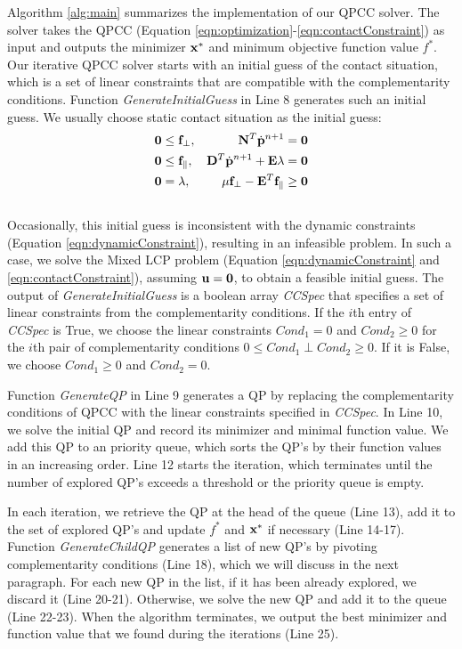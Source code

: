 Algorithm \ref{alg:main} summarizes the implementation of our QPCC solver. The solver takes the QPCC (Equation \ref{eqn:optimization}-\ref{eqn:contactConstraint}) as input and outputs the minimizer $\mathbf{x}^*$ and minimum objective function value $f^*$. Our iterative QPCC solver starts with an initial guess of the contact situation, which is a set of linear constraints that are compatible with the complementarity conditions. Function \emph{GenerateInitialGuess} in Line 8 generates such an initial guess. We usually choose static contact situation as the initial guess:
\begin{align}
\nonumber & \mathbf{0} \leq \mathbf{f}_\perp, & \mathbf{N}^T\dot{\mathbf{p}}^{n+1} = \mathbf{0}\\
\nonumber & \mathbf{0} \leq \mathbf{f}_\parallel, &  \mathbf{D}^T \dot{\mathbf{p}}^{n+1} + \mathbf{E} \lambda = \mathbf{0}\\
\nonumber & \mathbf{0} = \lambda, & \mu \mathbf{f}_\perp - \mathbf{E}^T \mathbf{f}_\parallel \geq \mathbf{0} \\
 \nonumber
\end{align}
Occasionally, this initial guess is inconsistent with the dynamic constraints (Equation \ref{eqn:dynamicConstraint}), resulting in an infeasible problem. In
such a case, we solve the Mixed LCP problem (Equation \ref{eqn:dynamicConstraint} and \ref{eqn:contactConstraint}), assuming $\mathbf{u}=\mathbf{0}$, to obtain a feasible initial guess. The output of \emph{GenerateInitialGuess} is a boolean array \emph{CCSpec} that specifies a set of linear constraints from the complementarity conditions. If the $i$th entry of \emph{CCSpec} is True, we choose the linear constraints $Cond_1 = 0$ and $Cond_2 \geq 0$ for the $i$th pair of complementarity conditions $0\leq Cond_1 \perp Cond_2 \geq 0$. If it is False, we choose $Cond_1 \geq 0$ and $Cond_2 = 0$.

Function \emph{GenerateQP} in Line 9 generates a QP by replacing the complementarity conditions of QPCC with the linear constraints specified in \emph{CCSpec}.
In Line 10, we solve the initial QP and record its minimizer and minimal function value. We add this QP to an priority queue, which sorts the QP's by their function values in an increasing order. Line 12 starts the iteration, which terminates until the number of explored QP's exceeds a threshold or the priority queue is empty.

In each iteration, we retrieve the QP at the head of the queue (Line 13), add it to the set of explored QP's and update $f^*$ and $\mathbf{x}^*$ if necessary (Line 14-17). Function \emph{GenerateChildQP} generates a list of new QP's by pivoting complementarity conditions (Line 18), which we will discuss
in the next paragraph. For each new QP in the list, if it has been already explored, we discard it (Line 20-21). Otherwise, we solve the new QP and add it to the queue (Line 22-23). When the algorithm terminates, we output the best minimizer and function value that we found during the iterations (Line 25).

